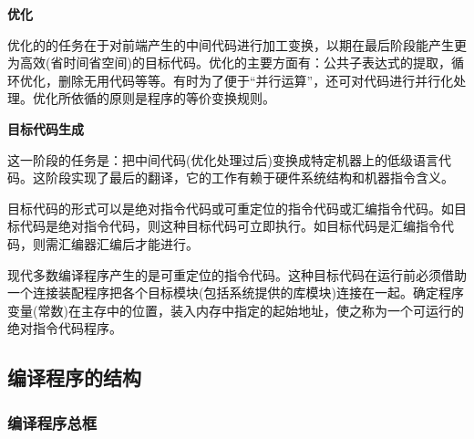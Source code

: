 \noindent\textbf{优化}

优化的的任务在于对前端产生的中间代码进行加工变换，以期在最后阶段能产生更为高效(省时间省空间)的目标代码。优化的主要方面有：公共子表达式的提取，循环优化，删除无用代码等等。有时为了便于``并行运算''，还可对代码进行并行化处理。优化所依循的原则是程序的等价变换规则。

\noindent\textbf{目标代码生成}

这一阶段的任务是：把中间代码(优化处理过后)变换成特定机器上的低级语言代码。这阶段实现了最后的翻译，它的工作有赖于硬件系统结构和机器指令含义。

目标代码的形式可以是绝对指令代码或可重定位的指令代码或汇编指令代码。如目标代码是绝对指令代码，则这种目标代码可立即执行。如目标代码是汇编指令代码，则需汇编器汇编后才能进行。

现代多数编译程序产生的是可重定位的指令代码。这种目标代码在运行前必须借助一个连接装配程序把各个目标模块(包括系统提供的库模块)连接在一起。确定程序变量(常数)在主存中的位置，装入内存中指定的起始地址，使之称为一个可运行的绝对指令代码程序。

\subsection{编译程序的结构}
\subsubsection{编译程序总框}

